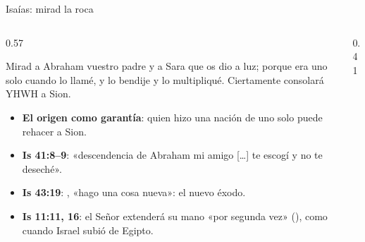 \begin{frame}{Isaías: mirad la roca}
\begin{columns}[c,onlytextwidth]
\begin{column}{0.57\textwidth}
\begin{cita}Mirad a Abraham vuestro padre y a Sara que os dio a luz; porque era uno solo cuando lo llamé, y lo bendije y lo multipliqué. Ciertamente consolará YHWH a Sion.\end{cita}
\scriptsize
\begin{itemize}
\item \textbf{El origen como garantía}: quien hizo una nación de uno solo puede rehacer a Sion.
\item \textbf{Is 41:8--9}: «descendencia de Abraham mi amigo [\ldots] te escogí y no te deseché».
\item \textbf{Is 43:19}: , «hago una cosa nueva»: el nuevo éxodo.
\item \textbf{Is 11:11, 16}: el Señor extenderá su mano «por segunda vez» (), como cuando Israel subió de Egipto.
\end{itemize}
\end{column}
\begin{column}{0.41\textwidth}\end{column}
\end{columns}
\end{frame}

